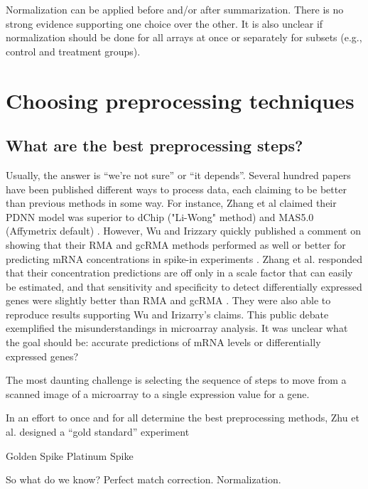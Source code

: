 Normalization can be applied before and/or after summarization.
There is no strong evidence supporting one choice over the other.
It is also unclear if normalization should be done for all arrays at once
or separately for subsets (e.g., control and treatment groups).

\section{Choosing preprocessing techniques}

\subsection{What are the best preprocessing steps?}

Usually, the answer is ``we're not sure'' or ``it depends''. 
Several hundred papers have been published
different ways to process data, each claiming to be better than
previous methods in some way. For instance, Zhang et al claimed their PDNN model 
was superior to dChip ("Li-Wong" method)
and MAS5.0 (Affymetrix default) \cite{Zhang:2003to}.
However, Wu and Irizzary quickly published a comment on 
showing that their
RMA and gcRMA methods performed as well or better for predicting
mRNA concentrations in spike-in experiments \cite{Wu:2004ul}.
Zhang et al. responded that their concentration predictions
are off only in a scale factor that can easily be estimated, and that
sensitivity and specificity to detect differentially expressed genes
were slightly better than RMA and gcRMA \cite{Zhang:2004tl}. They were also able to
reproduce results supporting Wu and Irizarry's claims. This public
debate exemplified the misunderstandings in microarray analysis.
It was unclear what the goal should be: accurate predictions of mRNA levels or
differentially expressed genes?

The most daunting challenge is selecting the sequence of steps
to move from a scanned image of a microarray to a single expression value
for a gene.


In an effort to once and for all determine the best
preprocessing methods, Zhu et al. designed a ``gold standard''
experiment









Golden Spike
Platinum Spike

So what do we know? Perfect match correction. Normalization.


